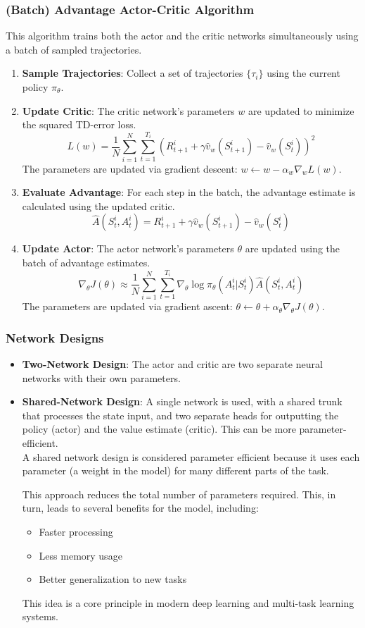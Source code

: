 \documentclass[12pt]{article}
\begin{document}
\subsubsection{ (Batch) Advantage Actor-Critic Algorithm}
This algorithm trains both the actor and the critic networks simultaneously using a batch of sampled trajectories.
\begin{enumerate}
    \item \textbf{Sample Trajectories}: Collect a set of trajectories $\{\tau_i\}$ using the current policy $\pi_\theta$.
    \item \textbf{Update Critic}: The critic network's parameters $w$ are updated to minimize the squared TD-error loss.
    $$ L(w) = \frac{1}{N} \sum_{i=1}^N \sum_{t=1}^{T_i} (R_{t+1}^i + \gamma \hat{v}_w(S_{t+1}^i) - \hat{v}_w(S_t^i))^2 $$
    The parameters are updated via gradient descent: $w \leftarrow w - \alpha_w \nabla_w L(w)$.
    \item \textbf{Evaluate Advantage}: For each step in the batch, the advantage estimate is calculated using the updated critic.
    $$ \hat{A}(S_t^i, A_t^i) = R_{t+1}^i + \gamma \hat{v}_w(S_{t+1}^i) - \hat{v}_w(S_t^i) $$
    \item \textbf{Update Actor}: The actor network's parameters $\theta$ are updated using the batch of advantage estimates.
    $$ \nabla_\theta J(\theta) \approx \frac{1}{N} \sum_{i=1}^N \sum_{t=1}^{T_i} \nabla_\theta \log \pi_\theta(A_t^i | S_t^i) \hat{A}(S_t^i, A_t^i) $$
    The parameters are updated via gradient ascent: $\theta \leftarrow \theta + \alpha_\theta \nabla_\theta J(\theta)$.
\end{enumerate}

\subsubsection{Network Designs}
\begin{itemize}
    \item \textbf{Two-Network Design}: The actor and critic are two separate neural networks with their own parameters.
    \item \textbf{Shared-Network Design}: A single network is used, with a shared trunk that processes the state input, and two separate heads for outputting the policy (actor) and the value estimate (critic). This can be more parameter-efficient. \\

    A shared network design is considered parameter efficient because it uses each parameter (a weight in the model) for many different parts of the task.

This approach reduces the total number of parameters required. This, in turn, leads to several benefits for the model, including:
\begin{itemize}
\item Faster processing
\item Less memory usage
\item Better generalization to new tasks
\end{itemize}
This idea is a core principle in modern deep learning and multi-task learning systems.
\end{itemize}
\end{document}

